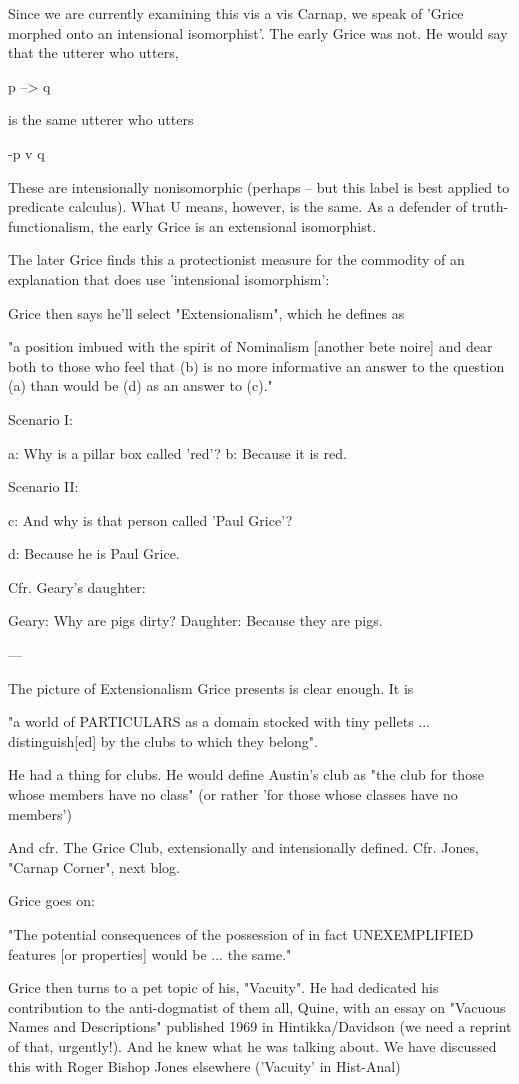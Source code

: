 \documentclass[10pt,titlepage]{book}
\begin{document}
{Since we are currently examining this vis a vis Carnap, we speak
of 'Grice morphed onto an intensional isomorphist'. The early Grice was
not. He would say that the utterer who utters,

p --> q

is the same utterer who utters

-p v q

These are intensionally nonisomorphic (perhaps -- but this label is
best applied to predicate calculus). What U means, however, is the
same. As a defender of truth-functionalism, the early Grice is an
extensional isomorphist.

The later Grice finds this a protectionist measure for the commodity of
an explanation that does use 'intensional isomorphism':

Grice then says he'll select "Extensionalism", which he defines as

"a position imbued with the
spirit of Nominalism [another bete noire]
and dear both to those who feel that (b) is no more
informative an answer to the question (a)
than would be (d) as an answer to
(c)."

Scenario I:


a: Why is a pillar box called 'red'?
b: Because it is red.


Scenario II:


c: And why is that person called 'Paul Grice'?

d: Because he is Paul Grice.


Cfr. Geary's daughter:

Geary: Why are pigs dirty?
Daughter: Because they are pigs.

---

The picture of Extensionalism Grice presents is clear enough. It is

"a world of PARTICULARS
as a domain
stocked with tiny pellets ...
distinguish[ed] by the clubs to which they
belong".

He had a thing for clubs. He would define Austin's club as "the club
for those whose members have no class" (or rather 'for those whose
classes have no members')

And cfr. The Grice Club, extensionally and intensionally defined. Cfr.
Jones, "Carnap Corner", next blog.

Grice goes on:

"The potential consequences of the possession
of in fact UNEXEMPLIFIED features [or properties]
would be ... the same."

Grice then turns to a pet topic of his, "Vacuity". He had dedicated his
contribution to the anti-dogmatist of them all, Quine, with an essay
on "Vacuous Names and Descriptions" published 1969 in Hintikka/Davidson
(we need a reprint of that, urgently!). And he knew what he was talking
about. We have discussed this with Roger Bishop Jones elsewhere
('Vacuity' in Hist-Anal)

}
\end{document}

